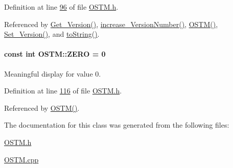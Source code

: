 Definition at line \hyperlink{_o_s_t_m_8h_source_l00096}{96} of file \hyperlink{_o_s_t_m_8h_source}{O\+S\+T\+M.\+h}.



Referenced by \hyperlink{_o_s_t_m_8cpp_source_l00089}{Get\+\_\+\+Version()}, \hyperlink{_o_s_t_m_8cpp_source_l00097}{increase\+\_\+\+Version\+Number()}, \hyperlink{_o_s_t_m_8cpp_source_l00020}{O\+S\+T\+M()}, \hyperlink{_o_s_t_m_8cpp_source_l00081}{Set\+\_\+\+Version()}, and \hyperlink{_o_s_t_m_8h_source_l00042}{to\+String()}.

\paragraph[{\texorpdfstring{Z\+E\+RO}{ZERO}}]{\setlength{\rightskip}{0pt plus 5cm}const int O\+S\+T\+M\+::\+Z\+E\+RO = 0\hspace{0.3cm}{\ttfamily [private]}}\hypertarget{class_o_s_t_m_a0bb6ae8411d25f8e7b82d0a61729ea89_a0bb6ae8411d25f8e7b82d0a61729ea89}{}\label{class_o_s_t_m_a0bb6ae8411d25f8e7b82d0a61729ea89_a0bb6ae8411d25f8e7b82d0a61729ea89}


Meaningful display for value 0. 



Definition at line \hyperlink{_o_s_t_m_8h_source_l00116}{116} of file \hyperlink{_o_s_t_m_8h_source}{O\+S\+T\+M.\+h}.



Referenced by \hyperlink{_o_s_t_m_8cpp_source_l00020}{O\+S\+T\+M()}.



The documentation for this class was generated from the following files\+:\begin{DoxyCompactItemize}
\item 
\hyperlink{_o_s_t_m_8h}{O\+S\+T\+M.\+h}\item 
\hyperlink{_o_s_t_m_8cpp}{O\+S\+T\+M.\+cpp}\end{DoxyCompactItemize}

